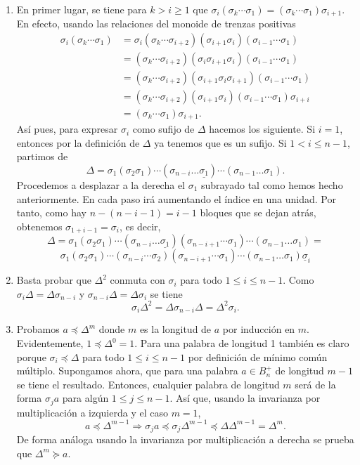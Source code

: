 \documentclass[TFG.tex]{subfiles}
\begin{document}
\begin{dem}\
\begin{enumerate}
\item En primer lugar, se tiene para $k>i\geq 1$ que $\sigma_i(\sigma_k\cdots\sigma_1)=(\sigma_k\cdots\sigma_1)\sigma_{i+1}$. En efecto, usando las relaciones del monoide de trenzas positivas
\begin{align*}
\sigma_i(\sigma_k\cdots\sigma_1)&=\sigma_i(\sigma_k\cdots\sigma_{i+2})(\sigma_{i+1}\sigma_i)(\sigma_{i-1}\cdots\sigma_1)\\
&=(\sigma_k\cdots\sigma_{i+2})(\sigma_i\sigma_{i+1}\sigma_i)(\sigma_{i-1}\cdots\sigma_1)\\
&=(\sigma_k\cdots\sigma_{i+2})(\sigma_{i+1}\sigma_i\sigma_{i+1})(\sigma_{i-1}\cdots\sigma_1)\\
&=(\sigma_k\cdots\sigma_{i+2})(\sigma_{i+1}\sigma_i)(\sigma_{i-1}\cdots\sigma_1)\sigma_{i+i}\\
&=(\sigma_k\cdots\sigma_1)\sigma_{i+1}.
\end{align*}
Así pues, para expresar $\sigma_i$ como sufijo de $\Delta$ hacemos los siguiente. Si $i=1$, entonces por la definición de $\Delta$ ya tenemos que es un sufijo. Si $1<i\leq n-1$, partimos de
\[
\Delta=\sigma_1(\sigma_2\sigma_1)\cdots(\sigma_{n-i}\dots\underline{\sigma_1})\cdots(\sigma_{n-1}\dots\sigma_1).
\]
Procedemos a desplazar a la derecha el $\sigma_1$ subrayado tal como hemos hecho anteriormente. En cada paso irá aumentando el índice en una unidad. Por tanto, como hay $n-(n-i-1)=i-1$ bloques que se dejan atrás, obtenemos $\sigma_{1+i-1}=\sigma_i$, es decir,
\[
\Delta=\sigma_1(\sigma_2\sigma_1)\cdots(\sigma_{n-i}\dots\underline{\sigma_1})(\sigma_{n-i+1}\cdots\sigma_1)\cdots(\sigma_{n-1}\dots\sigma_1)=
\]
\[
\sigma_1(\sigma_2\sigma_1)\cdots(\sigma_{n-i}\cdots\sigma_2)(\sigma_{n-i+1}\cdots\sigma_1)\cdots(\sigma_{n-1}\dots\sigma_1)\underline{\sigma}_i
\]


\item Basta probar que $\Delta^2$ conmuta con $\sigma_i$ para todo $1\leq i\leq n-1$. Como $\sigma_i\Delta=\Delta\sigma_{n-i}$ y $\sigma_{n-i}\Delta=\Delta\sigma_i$ se tiene
\[
\sigma_i\Delta^2=\Delta\sigma_{n-i}\Delta=\Delta^2\sigma_i.
\]


\item Probamos $a\preccurlyeq\Delta^m$ donde $m$ es la longitud de $a$ por inducción en $m$. Evidentemente, $1\preccurlyeq\Delta^0=1$. Para una palabra de longitud 1 también es claro porque $\sigma_i\preccurlyeq\Delta$ para todo $1\leq i\leq n-1$ por definición de mínimo común múltiplo. Supongamos ahora, que para una palabra $a\in B_n^+$ de longitud $m-1$ se tiene el resultado. Entonces, cualquier palabra de longitud $m$ será de la forma $\sigma_j a$ para algún $1\leq j\leq n-1$. Así que, usando la invarianza por multiplicación a izquierda y el caso $m=1$,
\[
a\preccurlyeq\Delta^{m-1}\Rightarrow \sigma_j a\preccurlyeq \sigma_j\Delta^{m-1} \preccurlyeq \Delta\Delta^{m-1}=\Delta^{m}.
\]
De forma análoga usando la invarianza por multiplicación a derecha se prueba que $\Delta^m\succcurlyeq a$.
\end{enumerate}
\QED
\end{dem}
\end{document}
